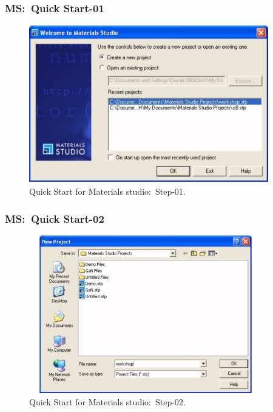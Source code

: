 \frame
{
	\frametitle{\textrm{MS:~Quick Start-01}}
\begin{figure}[h!]
\centering
\vspace*{-0.21in}
\includegraphics[height=2.70in,width=4.10in,viewport=0 0 1134 740,clip]{Figures/MS-New_Project-01.png}
\caption{\tiny \textrm{Quick Start for Materials studio:~Step-01.}}%
\label{MS-Quick_Start-01}
\end{figure}
}

\frame
{
	\frametitle{\textrm{MS:~Quick Start-02}}
\begin{figure}[h!]
\centering
\vspace*{-0.10in}
\includegraphics[height=2.70in,width=4.00in,viewport=0 0 1045 776,clip]{Figures/MS-New_Project-02.png}
\caption{\tiny \textrm{Quick Start for Materials studio:~Step-02.}}%
\label{MS-Quick_Start-02}
\end{figure}
}

